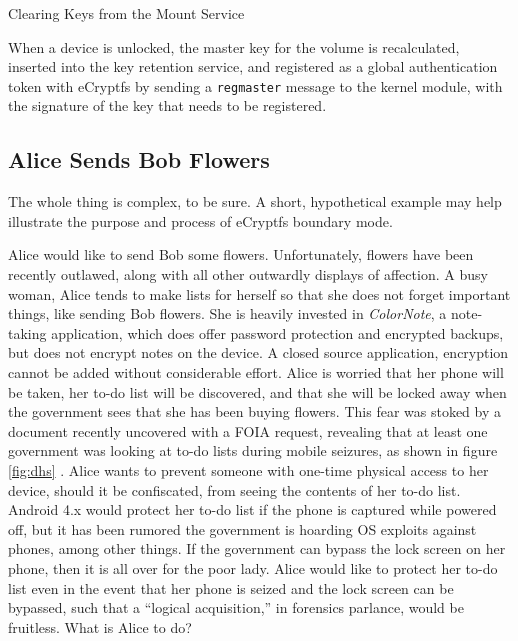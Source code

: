 \begin{table}

\caption{Clearing Keys from the Mount Service}
\label{tab:mountservice}
\end{table}

When a device is unlocked, the master key for the volume is recalculated, inserted into the key retention service, and registered
as a global authentication token with eCryptfs by sending a \texttt{regmaster} message to the kernel module, with the signature of
the key that needs to be registered. 

\subsection{Alice Sends Bob Flowers}
\label{sec:alicebob}
The whole thing is complex, to be sure. A short, hypothetical example may help illustrate the purpose and process of eCryptfs boundary mode.  

Alice would like to send Bob some flowers. Unfortunately, flowers have been recently outlawed, along with all other outwardly
displays of affection. A busy woman, Alice tends to make lists for herself so that she does not forget important things, like
sending Bob flowers. She is heavily invested in \emph{ColorNote}, a note-taking application, which does offer password protection
and encrypted backups, but does not encrypt notes on the device. A closed source application, encryption cannot be added without
considerable effort. Alice is worried that her phone will be taken, her to-do list will be discovered, and that she will be locked
away when the government sees that she has been buying flowers. This fear was stoked by a document recently uncovered with a FOIA
request, revealing that at least one government was looking at to-do lists during mobile seizures, as shown in figure \ref{fig:dhs}
\cite{dhsfoia}. Alice wants to prevent someone with one-time physical access to her device, should it be confiscated, from seeing
the contents of her to-do list. Android 4.x would protect her to-do list if the phone is captured while powered off, but it has
been rumored the government is hoarding OS exploits against phones, among other things. If the government can bypass the lock screen
on her phone, then it is all over for the poor lady. Alice would like to protect her to-do list even in the event that her phone is
seized and the lock screen can be bypassed, such that a ``logical acquisition,'' in forensics parlance, would be fruitless. What is
Alice to do?

